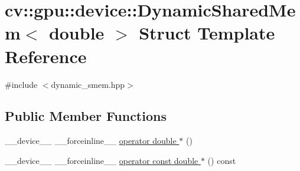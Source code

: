 \hypertarget{structcv_1_1gpu_1_1device_1_1DynamicSharedMem_3_01double_01_4}{\section{cv\-:\-:gpu\-:\-:device\-:\-:Dynamic\-Shared\-Mem$<$ double $>$ Struct Template Reference}
\label{structcv_1_1gpu_1_1device_1_1DynamicSharedMem_3_01double_01_4}
}


{\ttfamily \#include $<$dynamic\-\_\-smem.\-hpp$>$}

\subsection*{Public Member Functions}
\begin{DoxyCompactItemize}
\item 
\-\_\-\-\_\-device\-\_\-\-\_\- \-\_\-\-\_\-forceinline\-\_\-\-\_\- \hyperlink{structcv_1_1gpu_1_1device_1_1DynamicSharedMem_3_01double_01_4_a620ea7878abcc3bbfdd2515b816f7d4a}{operator double $\ast$} ()
\item 
\-\_\-\-\_\-device\-\_\-\-\_\- \-\_\-\-\_\-forceinline\-\_\-\-\_\- \hyperlink{structcv_1_1gpu_1_1device_1_1DynamicSharedMem_3_01double_01_4_a855e2970645240b59fb2e40005f0d9e7}{operator const double $\ast$} () const 
\end{DoxyCompactItemize}


